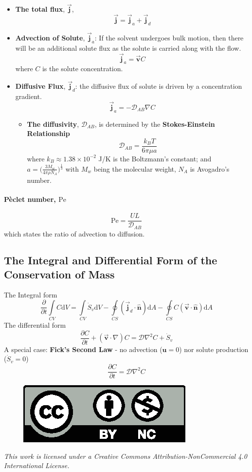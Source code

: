 \documentclass[12pt, a4paper]{article}
\numberwithin{equation}{subsection}
\begin{document}
\begin{itemize}
    \item \textbf{The total flux}, $\vec{\bm{j}}$, 
    \[
    \vec{\bm{j}} = \vec{\bm{j}}_a + \vec{\bm{j}}_d
    \]
    
    \item \textbf{Advection of Solute}, $\vec{\bm{j}}_a$: If the solvent undergoes bulk motion, then there will be an additional solute flux as the solute is carried along with the flow.
    \[
        \vec{\bm{j}}_a = \vec{\bm{v}}C
    \]
    where $C$ is the solute concentration.
    
    \item \textbf{Diffusive Flux}, $\vec{\bm{j}}_d$: the diffusive flux of solute is driven by a concentration gradient.
    \[
        \vec{\bm{j}}_a = -\mathcal{D}_{AB}\nabla C
    \]
        \begin{itemize}
            \item \textbf{The diffusivity}, $\mathcal{D}_{AB}$, is determined by the \textbf{Stokes-Einstein Relationship}
            \[
               \mathcal{D}_{AB} = \frac{k_{B}T}{6\pi \mu a} 
            \]
            where $k_B \approx 1.38\times 10^{-2}$ J/K is the Boltzmann's constant; and $\displaystyle a = \bigg(\frac{3M_w}{4\pi \rho N_A}\bigg)^{\frac{1}{3}}$ with $M_w$ being the molecular weight, $N_A$ is Avogadro’s number.
        \end{itemize}
\end{itemize}
\paragraph{P\`eclet number, $\mathrm{Pe}$}
\[
    \mathrm{Pe} = \frac{U L}{\mathcal{D}_{AB}}
\]
which states the ratio of advection to diffusion.

\subsection{The Integral and Differential Form of the Conservation of Mass}
The Integral form
\[
    \frac{\partial}{\partial t} \int\limits_{CV} C \mathrm{d}V = \int\limits_{CV} \dot{S}_v \mathrm{d}V - \oint\limits_{CS} (\vec{\bm{j}}_d \cdot \hat{\bm{n}}) \mathrm{d}A - \oint\limits_{CS} C (\vec{\bm{v}} \cdot \hat{\bm{n}}) \mathrm{d}A
\]
The differential form
\[
    \frac{\partial C}{\partial t} + (\vec{\bm{v}} \cdot \nabla)C = \mathcal{D}\nabla^2 C + \dot{S}_{v}
\]
A special case: \textbf{Fick's Second Law} - no advection ($\bm{u}=0$) nor solute production ($\dot{S}_{v}=0$)
\[
    \frac{\partial C}{\partial t} = \mathcal{D}\nabla^2 C
\]

\newpage
\thispagestyle{empty}
\mbox{}
\vfill    
\begin{figure}[H]
    \includegraphics[right]{img/by-nc.eps}
\end{figure}
\textit{This work is licensed under a Creative Commons Attribution-NonCommercial 4.0 International License.}
\end{document}

